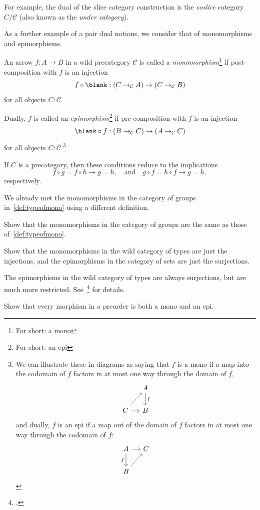For example, the dual of the slice category construction
is the \emph{coslice} category $C/\mathcal C$
(also known as the \emph{under category}).

As a further example of a pair dual notions, we consider that of
monomorphisms and epimorphisms.
\begin{definition}\label{def:mono-in-cat}
  An arrow $f : A \to B$ in a wild precategory $\mathcal C$
  is called a \emph{monomorphism}\footnote{For short: a mono} if
  post-composition with $f$ is an injection
  \[
    f\circ\blank : (C \to_{\mathcal C} A) \to (C \to_{\mathcal C} B)
  \]
  for all objects $C:\mathcal C$.
\end{definition}
\begin{definition}\label{def:epi-in-cat}
  Dually, $f$ is called an \emph{epimorphism}\footnote{For short: an epi}
  if pre-composition with $f$ is an injection
  \[
    \blank\circ f : (B \to_{\mathcal C} C) \to (A \to_{\mathcal C} C)
  \]
  for all objects $C:\mathcal C$.\footnote{%
    We can illustrate these in diagrams as saying that
    $f$ is a mono if a map into the codomain of $f$ factors in
    at most one way through the domain of $f$,
    \[
      \begin{tikzcd}[ampersand replacement=\&,column sep=small]
        \& A \ar[d,"f"] \\
        C \ar[ur,dashed]\ar[r] \& B
      \end{tikzcd}
    \]
    and dually, $f$ is an epi if a map out of the domain of $f$
    factors in at most one way through the codomain of $f$:
    \[
      \begin{tikzcd}[ampersand replacement=\&,column sep=small]
        A \ar[d,"f"']\ar[r] \& C \\
        B \ar[ur,dashed]
      \end{tikzcd}
    \]}
\end{definition}
If $C$ is a precategory, then these conditions reduce to the implications
\[
  f\circ g=f\circ h \to g=h, \quad\text{and}\quad g\circ f=h\circ f \to g=h,
\]
respectively.

We already met the monomorphisms in the category of groups in~\cref{def:typeofmono}
using a different definition.
\begin{xca}\label{xca:mono-cat-grp}
  Show that the monomorphisms in the category of groups are the same as
  those of~\cref{def:typeofmono}.
\end{xca}
\begin{xca}\label{xca:monos-epis-sets-types}
  Show that the monomorphisms in the wild category of types are just the injections,
  and the epimorphisms in the category of sets are just the surjections.
\end{xca}
The epimorphisms in the wild category of types are always surjections,
but are much more restricted. See~\citeauthor{BdJR2025}\footcite{BdJR2025} for details.
\begin{xca}\label{xca:monos-epis-preorder}
  Show that every morphism in a preorder is both a mono and an epi.
\end{xca}

